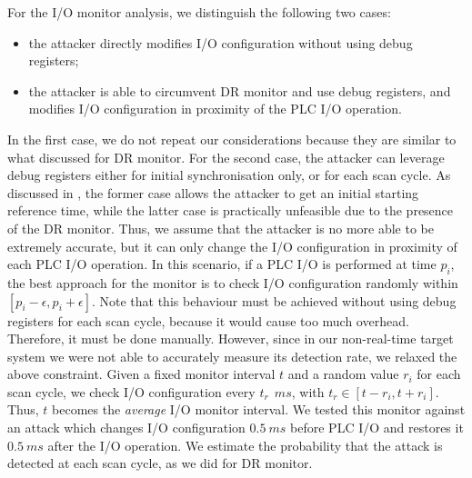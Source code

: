 For the I/O monitor analysis, we distinguish the following two cases:
\begin{itemize}
	\item the attacker directly modifies I/O configuration without using debug registers;
	\item the attacker is able to circumvent DR monitor and use debug registers, and modifies I/O configuration in proximity of the PLC I/O operation.
\end{itemize}
In the first case, we do not repeat our considerations because they are similar to what discussed for DR monitor.
For the second case, the attacker can leverage debug registers either for initial synchronisation only, or for each scan cycle.
As discussed in , the former case allows the attacker to get an initial starting reference time,
while the latter case is practically unfeasible due to the presence of the DR monitor.
Thus, we assume that the attacker is no more able to be extremely accurate, but it can only change the I/O configuration in proximity of each PLC I/O operation.
In this scenario, if a PLC I/O is performed at time $p_i$, the best approach for the monitor is to check I/O configuration randomly within $[p_i-\epsilon,p_i+\epsilon]$.
Note that this behaviour must be achieved without using debug registers for each scan cycle, because it would cause too much overhead.
Therefore, it must be done manually. However, since in our non-real-time target system we were not able to accurately measure its detection rate, we relaxed the above constraint.
Given a fixed monitor interval $t$ and a random value $r_i$ for each scan cycle, we check I/O configuration every $t_r ~\SI{}{ms}$, with $t_r \in [t-r_i,t+r_i]$.
Thus, $t$ becomes the \emph{average} I/O monitor interval. We tested this monitor against an attack which changes I/O configuration $\SI{0.5}{ms}$ before PLC I/O
and restores it $\SI{0.5}{ms}$ after the I/O operation. We estimate the probability that the attack is detected at each scan cycle, as we did for DR monitor.

